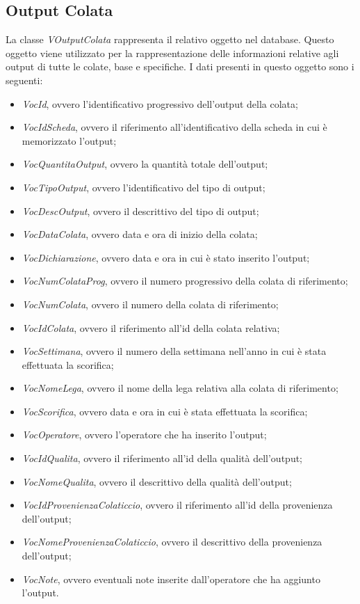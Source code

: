   \subsection{Output Colata}
  La classe \textit{VOutputColata} rappresenta il relativo oggetto nel database. Questo oggetto viene utilizzato per la
  rappresentazione delle informazioni relative agli output di tutte le colate, base e specifiche. I dati presenti in questo
  oggetto sono i seguenti:
  \begin{itemize}
    \item \textit{VocId}, ovvero l'identificativo progressivo dell'output della colata;
    \item \textit{VocIdScheda}, ovvero il riferimento all'identificativo della scheda in cui è memorizzato l'output;
    \item \textit{VocQuantitaOutput}, ovvero la quantità totale dell'output;
    \item \textit{VocTipoOutput}, ovvero l'identificativo del tipo di output;
    \item \textit{VocDescOutput}, ovvero il descrittivo del tipo di output;
    \item \textit{VocDataColata}, ovvero data e ora di inizio della colata;
    \item \textit{VocDichiarazione}, ovvero data e ora in cui è stato inserito l'output;
    \item \textit{VocNumColataProg}, ovvero il numero progressivo della colata di riferimento;
    \item \textit{VocNumColata}, ovvero il numero della colata di riferimento;
    \item \textit{VocIdColata}, ovvero il riferimento all'id della colata relativa;
    \item \textit{VocSettimana}, ovvero il numero della settimana nell'anno in cui è stata effettuata la scorifica;
    \item \textit{VocNomeLega}, ovvero il nome della lega relativa alla colata di riferimento;
    \item \textit{VocScorifica}, ovvero data e ora in cui è stata effettuata la scorifica;
    \item \textit{VocOperatore}, ovvero l'operatore che ha inserito l'output;
    \item \textit{VocIdQualita}, ovvero il riferimento all'id della qualità dell'output;
    \item \textit{VocNomeQualita}, ovvero il descrittivo della qualità dell'output;
    \item \textit{VocIdProvenienzaColaticcio}, ovvero il riferimento all'id della provenienza dell'output;
    \item \textit{VocNomeProvenienzaColaticcio}, ovvero il descrittivo della provenienza dell'output;
    \item \textit{VocNote}, ovvero eventuali note inserite dall'operatore che ha aggiunto l'output.
  \end{itemize}
  

